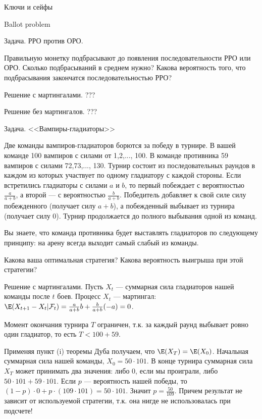 Ключи и сейфы \cite{aops:keys} %

Ballot problem \cite{ross:scp} %




Задача. РРО против ОРО\cite{li:ma}. %

Правильную монетку подбрасывают до появления последовательности РРО или ОРО. Сколько подбрасываний в среднем нужно? Какова вероятность того, что подбрасывания закончатся последовательностью РРО?

Решение с мартингалами. ???

Решение без мартингалов. ???



Задача. <<Вампиры-гладиаторы>> \cite{winkler:gpdp} %

Две команды вампиров-гладиаторов борются за победу в турнире. В вашей команде 100 вампиров с силами от 1,2,..., 100. В команде противника 59 вампиров с силами 72,73,..., 130. Турнир состоит из последовательных раундов в каждом из которых участвует по одному гладиатору с каждой стороны. Если встретились гладиаторы с силами $a$ и $b$, то первый побеждает с вероятностью $\frac{a}{a+b}$, а второй --- с вероятностью $\frac{b}{a+b}$. Победитель добавляет к свой силе силу побежденного (получает силу $a+b$), а побежденный выбывает из турнира (получает силу $0$). Турнир продолжается до полного выбывания одной из команд.

Вы знаете, что команда противника будет выставлять гладиаторов по следующему принципу: на арену всегда выходит самый слабый из команды.

Какова ваша оптимальная стратегия? Какова вероятность выигрыша при этой стратегии?

Решение с мартингалами. Пусть $X_{t}$ --- суммарная сила гладиаторов нашей команды после $t$ боев. Процесс $X_{t}$ --- мартингал: $\E(X_{t+1}-X_{t}|\mathcal{F}_{t})=\frac{a}{a+b}b+\frac{b}{a+b}(-a)=0$.

Момент окончания турнира $T$ ограничен, т.к. за каждый раунд выбывает ровно один гладиатор, то есть $T<100+59$.

Применяя пункт (i) теоремы Дуба получаем, что $\E(X_{T})=\E(X_{0})$. Начальная суммарная сила нашей команды, $X_{0}=50\cdot 101$. В конце турнира суммарная сила $X_{T}$ может принимать два значения: либо 0, если мы проиграли, либо $50\cdot 101+59\cdot 101$. Если $p$ --- вероятность нашей победы, то $(1-p)\cdot 0+p\cdot (109\cdot 101)=50\cdot 101$. Значит $p=\frac{50}{109}$. Причем результат не зависит от используемой стратегии, т.к. она нигде не использовалась при подсчете!




